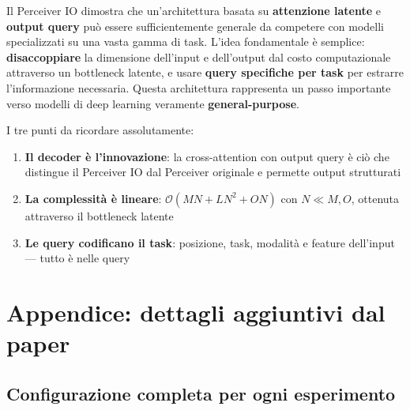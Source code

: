 \documentclass[12pt,a4paper]{article}
\begin{document}
\begin{notabox}
Il Perceiver IO dimostra che un'architettura basata su \textbf{attenzione latente} e \textbf{output query} pu\`o essere sufficientemente generale da competere con modelli specializzati su una vasta gamma di task. L'idea fondamentale \`e semplice: \textbf{disaccoppiare} la dimensione dell'input e dell'output dal costo computazionale attraverso un bottleneck latente, e usare \textbf{query specifiche per task} per estrarre l'informazione necessaria. Questa architettura rappresenta un passo importante verso modelli di deep learning veramente \textbf{general-purpose}.

I tre punti da ricordare assolutamente:
\begin{enumerate}
    \item \textbf{Il decoder \`e l'innovazione}: la cross-attention con output query \`e ci\`o che distingue il Perceiver IO dal Perceiver originale e permette output strutturati
    \item \textbf{La complessit\`a \`e lineare}: $\mathcal{O}(MN + LN^2 + ON)$ con $N \ll M, O$, ottenuta attraverso il bottleneck latente
    \item \textbf{Le query codificano il task}: posizione, task, modalit\`a e feature dell'input --- tutto \`e nelle query
\end{enumerate}
\end{notabox}


\section{Appendice: dettagli aggiuntivi dal paper}

\subsection{Configurazione completa per ogni esperimento}
\end{document}
